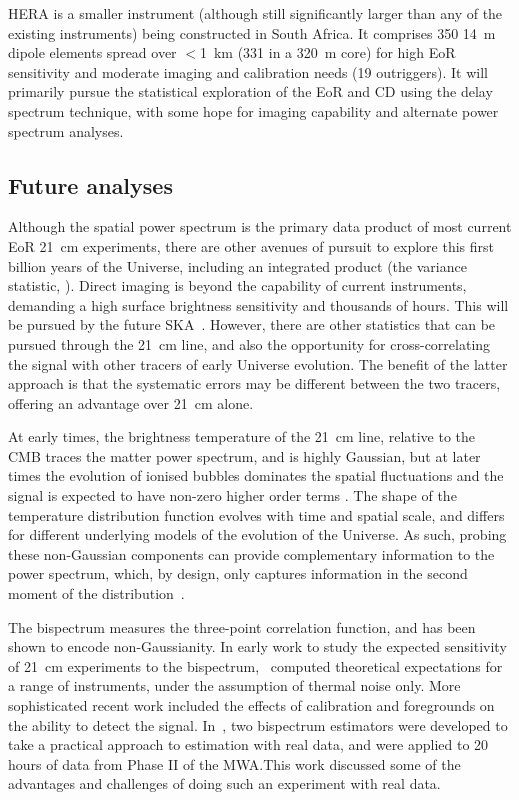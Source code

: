 HERA \cite{deboer16} is a smaller instrument (although still significantly larger than any of the existing instruments) being constructed in South Africa. It comprises 350 14~m dipole elements spread over $<$1~km (331 in a 320~m core) for high EoR sensitivity and moderate imaging and calibration needs (19 outriggers). It will primarily pursue the statistical exploration of the EoR and CD using the delay spectrum technique, with some hope for imaging capability and alternate power spectrum analyses.

\subsection{Future analyses}
Although the spatial power spectrum is the primary data product of most current EoR 21~cm experiments, there are other avenues of pursuit to explore this first billion years of the Universe, including an integrated product (the variance statistic, \cite{patil14}). Direct imaging is beyond the capability of current instruments, demanding a high surface brightness sensitivity and thousands of hours. This will be pursued by the future SKA~\cite{koopmans15}. However, there are other statistics that can be pursued through the 21~cm line, and also the opportunity for cross-correlating the signal with other tracers of early Universe evolution. The benefit of the latter approach is that the systematic errors may be different between the two tracers, offering an advantage over 21~cm alone.

At early times, the brightness temperature of the 21~cm line, relative to the CMB traces the matter power spectrum, and is highly Gaussian, but at later times the evolution of ionised bubbles dominates the spatial fluctuations and the signal is expected to have non-zero higher order terms \cite{furlanetto06,mcquinn06,eisenstein99}. The shape of the temperature distribution function evolves with time and spatial scale, and differs for different underlying models of the evolution of the Universe. As such, probing these non-Gaussian components can provide complementary information to the power spectrum, which, by design, only captures information in the second moment of the distribution~\cite{wyithe07}.

The bispectrum measures the three-point correlation function, and has been shown to encode non-Gaussianity. In early work to study the expected sensitivity of 21~cm experiments to the bispectrum,~\cite{yoshiura15} computed theoretical expectations for a range of instruments, under the assumption of thermal noise only. More sophisticated recent work included the effects of calibration and foregrounds on the ability to detect the signal. In~\cite{trott19_bispectrum}, two bispectrum estimators were developed to take a practical approach to estimation with real data, and were applied to 20 hours of data from Phase II of the MWA.\@ This work discussed some of the advantages and challenges of doing such an experiment with real data.%

